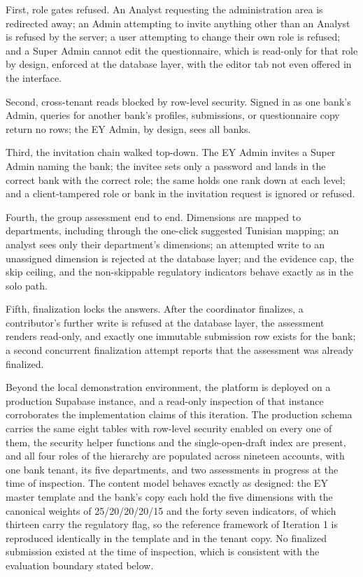 First, role gates refused. An Analyst requesting the administration area is redirected away; an Admin attempting to invite anything other than an Analyst is refused by the server; a user attempting to change their own role is refused; and a Super Admin cannot edit the questionnaire, which is read-only for that role by design, enforced at the database layer, with the editor tab not even offered in the interface.

Second, cross-tenant reads blocked by row-level security. Signed in as one bank's Admin, queries for another bank's profiles, submissions, or questionnaire copy return no rows; the EY Admin, by design, sees all banks.

Third, the invitation chain walked top-down. The EY Admin invites a Super Admin naming the bank; the invitee sets only a password and lands in the correct bank with the correct role; the same holds one rank down at each level; and a client-tampered role or bank in the invitation request is ignored or refused.

Fourth, the group assessment end to end. Dimensions are mapped to departments, including through the one-click suggested Tunisian mapping; an analyst sees only their department's dimensions; an attempted write to an unassigned dimension is rejected at the database layer; and the evidence cap, the skip ceiling, and the non-skippable regulatory indicators behave exactly as in the solo path.

Fifth, finalization locks the answers. After the coordinator finalizes, a contributor's further write is refused at the database layer, the assessment renders read-only, and exactly one immutable submission row exists for the bank; a second concurrent finalization attempt reports that the assessment was already finalized.

Beyond the local demonstration environment, the platform is deployed on a production Supabase instance, and a read-only inspection of that instance corroborates the implementation claims of this iteration. The production schema carries the same eight tables with row-level security enabled on every one of them, the security helper functions and the single-open-draft index are present, and all four roles of the hierarchy are populated across nineteen accounts, with one bank tenant, its five departments, and two assessments in progress at the time of inspection. The content model behaves exactly as designed: the EY master template and the bank's copy each hold the five dimensions with the canonical weights of 25/20/20/20/15 and the forty seven indicators, of which thirteen carry the regulatory flag, so the reference framework of Iteration 1 is reproduced identically in the template and in the tenant copy. No finalized submission existed at the time of inspection, which is consistent with the evaluation boundary stated below.

